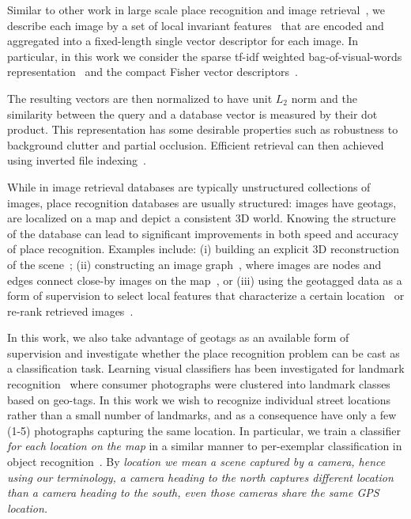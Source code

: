   Similar to other work in large scale place recognition \cite{Cummins09,Knopp2010,Schindler07,Torii2013} and image retrieval~\cite{Nister06,Philbin07,Sivic03,Jegou12}, we describe each image by a set of local invariant features~\cite{Bay06,Lowe04} that are encoded and aggregated into a fixed-length single vector descriptor for each image. In particular, in this work we consider the sparse tf-idf weighted bag-of-visual-words representation~\cite{Sivic03,Philbin07} and the compact Fisher vector descriptors~\cite{Jegou12}.  
  
  The resulting vectors are then normalized to have unit $L_2$ norm and the similarity between the query and a database vector is measured by their dot product. This representation has some desirable properties such as robustness to background clutter and partial occlusion. Efficient retrieval can then achieved using inverted file indexing~\cite{Jegou11}.


  While in image retrieval  databases are typically unstructured collections of images, place recognition databases are usually structured: images have geotags, are localized on a map and depict a consistent 3D world.
  Knowing the structure of the database can lead to significant improvements in both speed and accuracy of place recognition. 
  Examples include: (i) building an explicit 3D reconstruction of the scene~\cite{Irschara2009,Li10,Li12}; (ii) constructing an image graph~\cite{Cao13,Philbin10c,Turcot09}, where images are nodes and edges connect close-by images on the map~\cite{Torii11}, or (iii) using the geotagged data as a form of supervision to select local features that characterize a certain location~\cite{Knopp2010,Schindler07} or re-rank retrieved images~\cite{Zamir10}.

  In this work, we also take advantage of geotags as an available form of supervision and investigate whether the place recognition problem can be cast as a classification task.
  {
    Learning visual classifiers has been investigated for landmark recognition~\cite{Li09} where consumer photographs were clustered into landmark classes based on geo-tags. 
    In this work we wish to recognize individual street locations rather than a small number of landmarks, and as a consequence have only a few (1-5) photographs
    \textcolor{petr}{capturing the same location}.
    In particular, we train a classifier {\em for each location on the map} in a similar manner to per-exemplar classification in object recognition~\cite{Malisiewicz11}. 
    \textcolor{petr}{
      By \em{location} we mean a scene captured by a camera, hence using our terminology, a camera heading to the north captures different location than a camera heading to the south, even those cameras share the same GPS location. 
    }
  }


